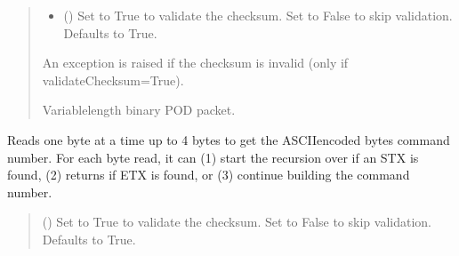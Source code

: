 \documentclass[letterpaper,10pt,english]{sphinxmanual}
\begin{document}
\begin{fulllineitems}
\begin{fulllineitems}
\begin{quote}
\begin{description}
\begin{itemize}
\item {} 
\sphinxAtStartPar
{} (\sphinxstyleliteralemphasis{\sphinxupquote{, }}) \textendash{} Set to True to validate the checksum. Set to False to                 skip validation. Defaults to True.

\end{itemize}

\sphinxAtStartPar
{} \textendash{} An exception is raised if the checksum is invalid (only if validateChecksum=True).

\sphinxAtStartPar
Variable\sphinxhyphen{}length binary POD packet.

\sphinxAtStartPar
{\hyperref[\detokenize{Morelia.Packets:Morelia.Packets.Binary.PacketBinary}]{}}

\end{description}\end{quote}

\end{fulllineitems}


\begin{fulllineitems}
\label{\detokenize{Morelia.Devices:Morelia.Devices.BasicPodProtocol.Pod._Read_GetCommand}}
\pysigstartsignatures
{}
\pysigstopsignatures
\sphinxAtStartPar
Reads one byte at a time up to 4 bytes to get the ASCII\sphinxhyphen{}encoded bytes command number. For each         byte read, it can (1) start the recursion over if an STX is found, (2) returns if ETX is found, or         (3) continue building the command number.
\begin{quote}\begin{description}
\sphinxAtStartPar
{} (\sphinxstyleliteralemphasis{\sphinxupquote{, }}) \textendash{} Set to True to validate the checksum. Set to False to skip                 validation. Defaults to True.


\end{description}
\end{quote}
\end{fulllineitems}
\end{fulllineitems}
\end{document}
